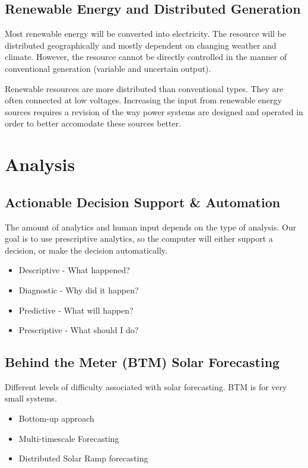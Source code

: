 \documentclass[12pt, a4paper]{report}
\begin{document}
  \subsection{Renewable Energy and Distributed Generation}

  Most renewable energy will be converted into electricity. The resource will be distributed geographically and mostly dependent on changing weather and climate. However, the resource cannot be directly controlled in the manner of conventional generation (variable and uncertain output).

  Renewable resources are more distributed than conventional types. They are often connected at low voltages. Increasing the input from renewable energy sources requires a revision of the way power systems are designed and operated in order to better accomodate these sources better.

  \section{Analysis}

  \subsection{Actionable Decision Support \& Automation}

  The amount of analytics and human input depends on the type of analysis. Our goal is to use prescriptive analytics, so the computer will either support a decision, or make the decision automatically.

  \begin{itemize}
    \item Descriptive - What happened?
    \item Diagnostic - Why did it happen?
    \item Predictive - What will happen?
    \item Prescriptive - What should I do?
  \end{itemize}

  \subsection{Behind the Meter (BTM) Solar Forecasting}
  Different levels of difficulty associated with solar forecasting. BTM is for very small systems.
  \begin{itemize}
    \item Bottom-up approach
    \item Multi-timescale Forecasting
    \item Distributed Solar Ramp forecasting
  \end{itemize}
\end{document}
